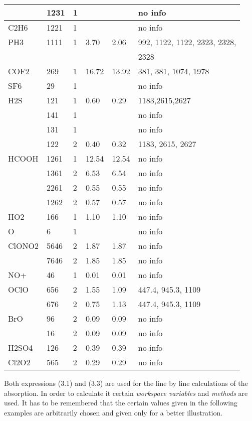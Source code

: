 \begin{longtable}{llllll}
      & 1231& 1& & & no info\\
\hline
  C2H6& 1221& 1& & & no info\\
%
%
\hline
  PH3& 1111& 1& 3.70& 2.06& 992, 1122, 1122, 2323, 2328,\\
     &     &  &     &     & 2328\\
\hline
  COF2& 269& 1& 16.72& 13.92& 381, 381, 1074, 1978\\
\hline
  SF6& 29& 1& & & no info\\
\hline
  H2S& 121& 1& 0.60& 0.29& 1183,2615,2627\\
     & 141& 1& & & no info\\
     & 131& 1& & & no info\\
     & 122& 2& 0.40& 0.32& 1183, 2615, 2627\\
\hline
  HCOOH& 1261& 1& 12.54& 12.54& no info\\
       & 1361& 2& 6.53& 6.54& no info\\
       & 2261& 2& 0.55& 0.55& no info\\
       & 1262& 2& 0.57& 0.57& no info\\
\hline
  HO2& 166& 1& 1.10& 1.10& no info\\
\hline
  O& 6& 1& & & no info\\
\hline
  ClONO2& 5646& 2& 1.87& 1.87& no info\\
        & 7646& 2& 1.85& 1.85& no info\\
\hline
  NO+& 46& 1& 0.01& 0.01& no info\\
\hline
  OClO& 656& 2& 1.55& 1.09& 447.4, 945.3, 1109\\
      & 676& 2& 0.75& 1.13& 447.4, 945.3, 1109\\
\hline
  BrO& 96& 2& 0.09& 0.09& no info\\
     & 16& 2& 0.09& 0.09& no info\\
\hline
  H2SO4& 126& 2& 0.39& 0.39& no info\\
\hline
  Cl2O2& 565& 2& 0.29& 0.29& no info\\
\end{longtable}




Both expressions (3.1) and (3.3) are used for the line by line
calculations of the absorption. In order to calculate it certain 
{\it workspace variables} and {\it methods} are used. It has to be
remembered that the certain values given in the following examples are
arbitrarily chosen and given only for a better illustration. 

